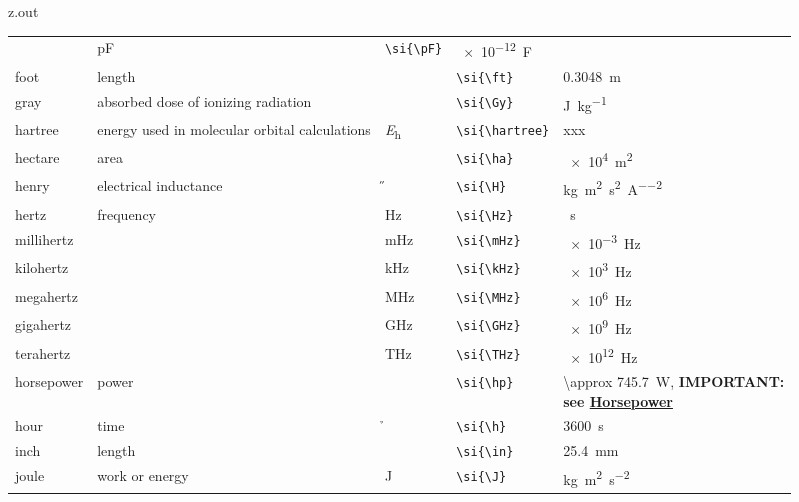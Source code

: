 \begin{VerbatimOut}{z.out}
{\begin{longtable}{@{}P{1.4in}P{1in}llP{1.8in}@{}}
      \ditto&
      \si{\pF}&
      \verb+\si{\pF}+&
      \SI{e-12}{\F}\\
    \vsp
    foot&
      length&
      \si{\ft}&
      \verb+\si{\ft}+&
      \SI{0.3048}{\m}\\  %
    \vsp
    gray&
      absorbed dose of ionizing radiation&
      \si{\Gy}&
      \verb+\si{\Gy}+&
      \si{\J\per\kg}\\
    \vsp
    hartree&
      energy used in molecular orbital calculations&
      \si{\hartree}&
      \verb+\si{\hartree}+&
      xxx\\
    \vsp
    hectare&
      area&
      \si{\ha}&
      \verb+\si{\ha}+&
      \SI{e4}{\m\squared}\\
    \vsp
    henry&
      electrical inductance&
      \si{\H}&
      \verb+\si{\H}+&
      \si{\kg\m\squared\per\s\squared\per\A\squared}\\
    \vsp
    hertz&
      frequency&
      \si{\Hz}&
      \verb+\si{\Hz}+&
      \si{\per\s}\\
    \quad millihertz&
      \ditto&
      \si{\mHz}&
      \verb+\si{\mHz}+&
      \SI{e-3}{\Hz}\\
    \quad kilohertz&
      \ditto&
      \si{\kHz}&
      \verb+\si{\kHz}+&
      \SI{e3}{\Hz}\\
    \quad megahertz&
      \ditto&
      \si{\MHz}&
      \verb+\si{\MHz}+&
      \SI{e6}{\Hz}\\
    \quad gigahertz&
      \ditto&
      \si{\GHz}&
      \verb+\si{\GHz}+&
      \SI{e9}{\Hz}\\
    \quad terahertz&
      \ditto&
      \si{\THz}&
      \verb+\si{\THz}+&
      \SI{e12}{\Hz}\\
    \vsp
    horsepower&
      power&
      \si{\hp}&
      \verb+\si{\hp}+&
      \SI{\approx 745.7}{\W}, {\bfseries IMPORTANT:\newline
        see \href{https://en.wikipedia.org/wiki/Horsepower#Mechanical_horsepower}{Horsepower}}\\
    \vsp
    hour&
      time&
      \si{\h}&
      \verb+\si{\h}+&
      \SI{3600}{\s}\\
    \vsp
    inch&
      length&
      \si{\in}&
      \verb+\si{\in}+&
      \SI{25.4}{\mm}\\  %
    \vsp
    joule&
      work or energy&
      \si{\J}&
      \verb+\si{\J}+&
      \si{\kg\m\squared\per\s\squared}\\

\end{longtable}}
\end{VerbatimOut}
